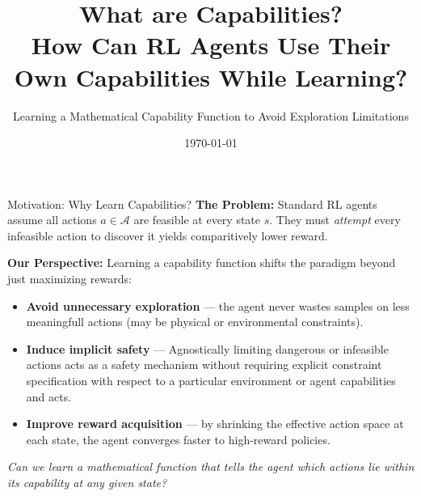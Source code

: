 \documentclass[11pt,aspectratio=169]{beamer}
\title[Learning Capabilities in RL]{What are Capabilities?\\How Can RL Agents Use Their Own Capabilities While Learning?}
\subtitle{Learning a Mathematical Capability Function to Avoid Exploration Limitations}
\author{}
\date{\today}
\begin{document}
\begin{frame}
    \titlepage
\end{frame}

\begin{frame}{Motivation: Why Learn Capabilities?}
    \textbf{The Problem:} Standard RL agents assume all actions $a \in \mathcal{A}$ are feasible at every state $s$. They must \textit{attempt} every infeasible action to discover it yields comparitively lower reward.

    \vspace{0.4cm}
    \textbf{Our Perspective:} Learning a capability function shifts the paradigm beyond just maximizing rewards:

    \begin{itemize}
        \item \textbf{Avoid unnecessary exploration} — the agent never wastes samples on  less meaningfull actions (may be physical or environmental constraints).
        \item \textbf{Induce implicit safety} — Agnostically limiting dangerous or infeasible actions acts as a safety mechanism without requiring explicit constraint specification with respect to a particular environment or agent capabilities and acts.
        \item \textbf{Improve reward acquisition} — by shrinking the effective action space at each state, the agent converges faster to high-reward policies.
    \end{itemize}

    \vspace{0.3cm}
    \textit{Can we learn a mathematical function that tells the agent which actions lie within its capability at any given state?}
\end{frame}
\end{document}
